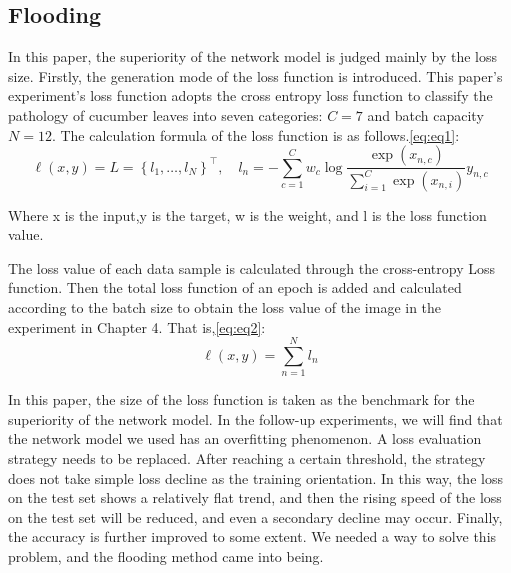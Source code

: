 \documentclass[a4paper,fleqn]{cas-sc}
\begin{document}
\subsection{Flooding}
In this paper, the superiority of the network model is judged mainly by the loss size. Firstly, the generation mode of the loss function is introduced. This paper's experiment's loss function adopts the cross entropy loss function to classify the pathology of cucumber leaves into seven categories: $C=7$ and batch capacity $N=12$. The calculation formula of the loss function is as follows.\ref{eq:eq1}:
\begin{equation}
\label{eq:eq1}
\ell(x, y)=L=\left\{l_{1}, \ldots, l_{N}\right\}^{\top}, \quad l_{n}=-\sum_{c=1}^{C} w_{c} \log \frac{\exp \left(x_{n, c}\right)}{\sum_{i=1}^{C} \exp \left(x_{n, i}\right)} y_{n, c}
\end{equation}

Where x is the input,y is the target, w is the weight, and l is the loss function value. 

The loss value of each data sample is calculated through the cross-entropy Loss function. Then the total loss function of an epoch is added and calculated according to the batch size to obtain the loss value of the image in the experiment in Chapter 4. That is,\ref{eq:eq2}:
\begin{equation}
\label{eq:eq2}
\ell(x,y)=\sum_{n=1}^{N} l_{n}
\end{equation}

In this paper, the size of the loss function is taken as the benchmark for the superiority of the network model. In the follow-up experiments, we will find that the network model we used has an overfitting phenomenon. A loss evaluation strategy needs to be replaced. After reaching a certain threshold, the strategy does not take simple loss decline as the training orientation. In this way, the loss on the test set shows a relatively flat trend, and then the rising speed of the loss on the test set will be reduced, and even a secondary decline may occur. Finally, the accuracy is further improved to some extent. We needed a way to solve this problem, and the flooding method came into being. \cite{ishida2020we}
\end{document}
